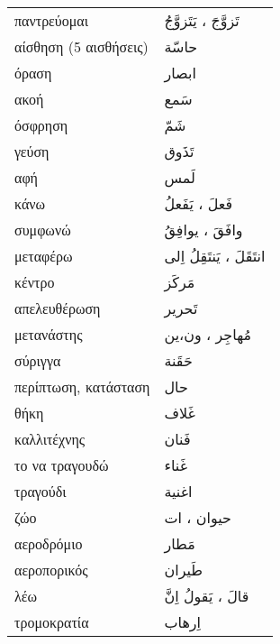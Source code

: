 \documentclass[twocolumn,a4paper]{article}
\newcommand{\ar}[1]{\textarabic{#1}}
\newcommand{\pl}{\raisebox{0.15ex}{\footnotesize ◍}}
\newcommand{\normpl}[1]{\ar{ #1، ات }}
\newcommand{\mfnormpl}[1]{\ar{ #1، ون،ين }}
\newcommand{\vrf}{\raisebox{0.15ex}{\footnotesize ◉}}
\newcommand{\mas}{\raisebox{0.15ex}{\footnotesize ◫}}
\begin{document}
\begin{mpsupertabular}{ P{0.5\textwidth} P{0.5\textwidth} }
παντρεύομαι \vrf             & \ar{ تَزوَّجَ ، يَتَزوَّجُ } \\
αίσθηση (5 αισθήσεις)        & \ar{ حاسّة } \\
όραση                        & \ar{ ابصار } \\
ακοή                         & \ar{ سَمع } \\
όσφρηση                      & \ar{ شَمّ } \\
γεύση                        & \ar{ تَذَوق } \\
αφή                          & \ar{ لَمس } \\
κάνω \vrf                    & \ar{ فَعلَ ، يَفَعلُ } \\
συμφωνώ \vrf                 & \ar{ وافَقَ ، يوافِقُ } \\
μεταφέρω \vrf                & \ar{ انتَقَلَ ، يَنتَقِلُ اِلى} \\
κέντρο                       & \ar{ مَركَز } \\
απελευθέρωση                 & \ar{ تَحرير } \\
μετανάστης  \pl              & \mfnormpl{ مُهاجِر } \\
σύριγγα                      & \ar{ حَقَنة } \\
περίπτωση, κατάσταση         & \ar{ حال } \\
θήκη                         & \ar{ غَلاف } \\
καλλιτέχνης                  & \ar{ فَنان } \\
το να τραγουδώ  \mas         & \ar{ غَناء } \\
τραγούδι                     & \ar{ اغنية } \\
ζώο \pl                      & \normpl{ حيوان } \\
αεροδρόμιο                   & \ar{ مَطار } \\
αεροπορικός                  & \ar{ طَيران } \\
λέω \vrf                     & \ar{ قالَ ، يَقولُ اِنَّ } \\
τρομοκρατία                  & \ar{ اِرهاب } \\


\end{mpsupertabular}

\end{document}
